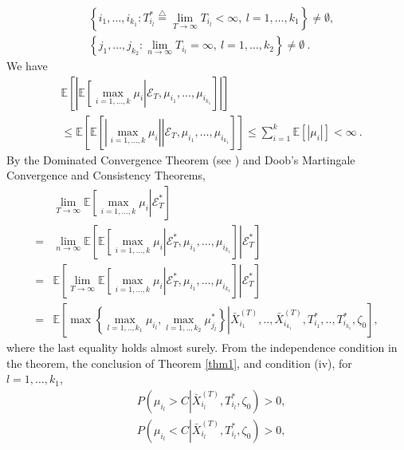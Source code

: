\documentclass[journal]{IEEEtran}
\newcommand{\ed}{\stackrel{\triangle}{=}}
\begin{document}
\begin{IEEEproof}
\begin{align*}
                  &\left\{ i_1,\ldots,i_{k_1}: T^{*}_{i_{l}}\ed\lim_{T\to\infty} T_{i_{l}}<\infty,~ l=1,\ldots,k_1\right\} \neq \emptyset,\\
                  &\left\{ j_1,\ldots,j_{k_2}: \lim_{n\to\infty} T_{i_{l}}=\infty,~l=1,\ldots,k_2\right\} \neq \emptyset~.\end{align*}
                  We have 
                  \begin{align*}&\mathbb{E}\left[\left|\mathbb{E} \left.\left[ \max_{i=1,\ldots,k} \mu_i\right|\mathcal{E}_T,\mu_{i_1},\ldots,\mu_{i_{k_1}}\right]\right|\right]\\
                  &\leq \mathbb{E}\left[\mathbb{E} \left.\left[ \left|\max_{i=1,\ldots,k} \mu_i\right|\right|\mathcal{E}_T,\mu_{i_1},\ldots,\mu_{i_{k_1}}\right]\right]\leq \sum_{i=1}^{k} \mathbb{E}[|\mu_i|]<\infty~.\end{align*}
                  By the Dominated Convergence Theorem (see \cite{rudin1987real}) and  Doob's Martingale Convergence and Consistency Theorems,\small
                  \begin{align*}
                  &\lim_{T\to\infty}\mathbb{E} \left.\left[ \max_{i=1,\ldots,k} \mu_i\right|\mathcal{E}_T^{*}\right]\\
                  =&\lim_{n\to\infty}\left.\mathbb{E}\left[\mathbb{E} \left.\left[ \max_{i=1,\ldots,k} \mu_i\right|\mathcal{E}_T^{*},\mu_{i_1},\ldots,\mu_{i_{k_1}}\right]\right|\mathcal{E}_T^{*}\right]\\
                  =&\left.\mathbb{E}\left[\lim_{T\to\infty}\mathbb{E} \left.\left[ \max_{i=1,\ldots,k} \mu_i\right|\mathcal{E}_T^{*},\mu_{i_1},\ldots,\mu_{i_{k_1}}\right]\right|\mathcal{E}_T^{*}\right]\\
                  =&\left.\mathbb{E}\left[ \max\left\{ \max_{l=1,..,k_1} \mu_{i_{l}},\max_{l=1,..,k_2}\mu_{j_{l}}^{*}\right \}\right|\bar{X}_{i_1}^{(T)},..,\bar{X}_{i_{k_1}}^{(T)},T^{*}_{i_{1}},..,T^{*}_{i_{k_1}},\zeta_0\right],
                  \end{align*}\normalsize
                  where the last equality holds almost surely. 
                  From the independence condition in the theorem, the conclusion of Theorem \ref{thm1}, and condition (iv),  for $l=1,\ldots,k_1$,
                  \begin{align*}&P\left(\mu_{i_{l}}>C \left|\bar{X}_{i_l}^{(T)}\right.,T_{i_l}^{*},\zeta_0\right)>0,\\ &P\left(\mu_{i_{l}}<C\left|\bar{X}_{i_l}^{(T)}\right.,T_{i_l}^{*},\zeta_0\right)>0,\end{align*}

\end{IEEEproof}
\end{document}
